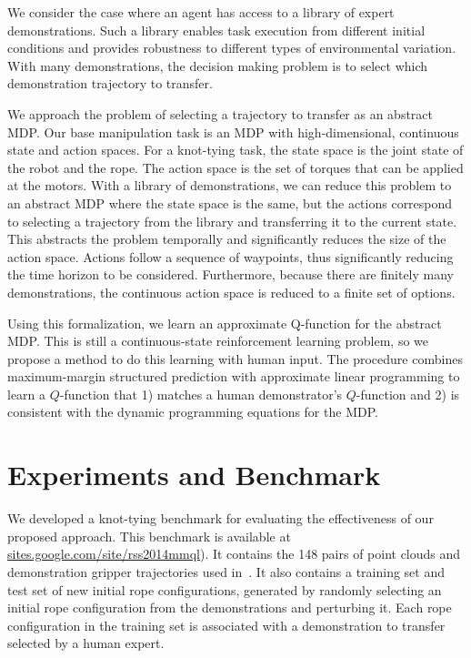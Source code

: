 \documentclass[conference]{IEEEtran}
\begin{document}
We consider the case where an agent has access to a library of expert
demonstrations. Such a library enables task execution from different
initial conditions and provides robustness to different types of
environmental variation. With many demonstrations, the decision making
problem is to select which demonstration trajectory to transfer.

We approach the problem of selecting a trajectory to transfer as an
abstract MDP. Our base manipulation task is an MDP with
high-dimensional, continuous state and action spaces. For a knot-tying
task, the state space is the joint state of the robot and the
rope. The action space is the set of torques that can be applied at
the motors. With a library of demonstrations, we can reduce this
problem to an abstract MDP where the state space is the same, but the
actions correspond to selecting a trajectory from the library and transferring it to
the current state. This abstracts the problem temporally and
significantly reduces the size of the action space. Actions follow a
sequence of waypoints, thus significantly reducing the time horizon to be considered.
Furthermore, because there are finitely many
demonstrations, the continuous action space is reduced to a finite
set of options.

Using this formalization, we learn an approximate Q-function for the
abstract MDP. This is still a continuous-state reinforcement learning
problem, so we propose a method to do this learning with human
input. The procedure combines maximum-margin structured prediction
with approximate linear programming to learn a $Q$-function that 1)
matches a human demonstrator's $Q$-function and 2) is consistent
with the dynamic programming equations for the MDP. 

\section{Experiments and Benchmark}

We developed a knot-tying benchmark for evaluating the effectiveness
of our proposed approach.  This benchmark is available at
\href{https://sites.google.com/site/rss2014mmql}{sites.google.com/site/rss2014mmql}). It
contains the 148 pairs of point clouds and demonstration gripper trajectories used
in~\citet{Schulmanetal_ISRR2013}. It also contains a training set and test set of new
initial rope configurations, generated by randomly selecting 
an initial rope configuration from the demonstrations and perturbing
it. Each rope configuration in the training set is
associated with a demonstration to transfer selected by a human expert.
\end{document}
